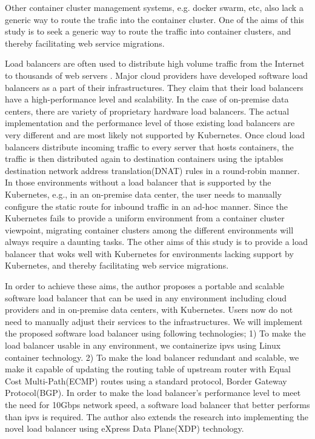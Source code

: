 Other container cluster management systems, e.g. docker swarm, etc, also lack a generic way to route the trafic into the container cluster.
One of the aims of this study is to seek a generic way to route the traffic into container clusters, and thereby facilitating web service migrations.

Load balancers are often used to distribute high volume traffic from the Internet to thousands of web servers .
Major cloud providers have developed software load balancers\cite{eisenbud2016maglev,patel2013ananta} as a part of their infrastructures.
They claim that their load balancers have a high-performance level and scalability.
In the case of on-premise data centers, there are variety of proprietary hardware load balancers.
The actual implementation and the performance level of those existing load balancers are very different and are most likely not supported by Kubernetes.
%
Once cloud load balancers distribute incoming traffic to every server that hosts containers,
the traffic is then distributed again to destination containers using the iptables destination network address translation(DNAT)\cite{MartinA.Brown2017,Marmol2015} rules in a round-robin manner.
In those environments without a load balancer that is supported by the Kubernetes, e.g., in an on-premise data center, the user needs to manually configure the static route for inbound traffic in an ad-hoc manner.
Since the Kubernetes fails to provide a uniform environment from a container cluster viewpoint, migrating container clusters among the different environments will always require a daunting tasks.
The other aims of this study is to provide a load balancer that woks well with Kubernetes for environments lacking support by Kubernetes, and thereby facilitating web service migrations.

In order to achieve these aims, the author proposes a portable and scalable software load balancer that can be used in any environment including cloud providers and in on-premise data centers, with Kubernetes.
Users now do not need to manually adjust their services to the infrastructures.
We will implement the proposed software load balancer using following technologies;
1) To make the load balancer usable in any environment, we containerize ipvs\cite{Zhang2000} using Linux container technology\cite{menage2007adding}.
2) To make the load balancer redundant and scalable, we make it capable of updating the routing table of upstream router with Equal Cost Multi-Path(ECMP) routes\cite{al2008scalable} using a standard protocol, Border Gateway Protocol(BGP).
In order to make the load balancer's performance level to meet the need for 10Gbps network speed, a software load balancer that better performs than ipvs is required.
The author also extends the research into implementing the novel load balancer using eXpress Data Plane(XDP) technology\cite{bertin2017xdp}.

